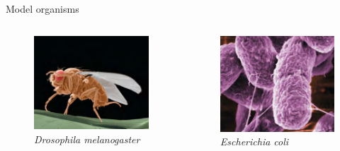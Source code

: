 \documentclass[11pt,ignorenonframetext,aspectratio=169]{beamer}
\begin{document}
\begin{frame}{Model organisms}
\protect\hypertarget{model-organisms}{}
\begin{columns}[T,onlytextwidth]
  
  
\begin{figure}
\includegraphics[width=0.8\linewidth]{../images/model_organisms_drosophila} \caption{\textit{Drosophila melanogaster}}\label{fig:model-organisms-drosophila}
\end{figure}


\begin{figure}
\includegraphics[width=0.8\linewidth]{../images/model_organisms_coli} \caption{\textit{Escherichia coli}}\label{fig:model-organisms-ecoli}
\end{figure}


\end{columns}
\end{frame}
\end{document}
